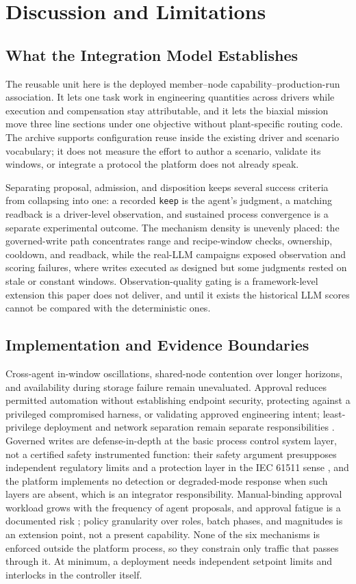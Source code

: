 \section{Discussion and Limitations}
\label{sec:limits}
\subsection{What the Integration Model Establishes}
The reusable unit here is the deployed member--node capability--production-run
association. It lets one task work in engineering quantities across drivers while
execution and compensation stay attributable, and it lets the biaxial mission move
three line sections under one objective without plant-specific routing code. The
archive supports configuration reuse inside the existing driver and scenario
vocabulary; it does not measure the effort to author a scenario, validate its
windows, or integrate a protocol the platform does not already speak.

Separating proposal, admission, and disposition keeps several success criteria from
collapsing into one: a recorded \texttt{keep} is the agent's judgment, a matching
readback is a driver-level observation, and sustained process convergence is a
separate experimental outcome. The mechanism density is unevenly placed: the
governed-write path concentrates range and recipe-window checks, ownership,
cooldown, and readback, while the real-LLM campaigns exposed observation and
scoring failures, where writes executed as designed but some judgments rested on
stale or constant windows. Observation-quality gating is a framework-level
extension this paper does not deliver, and until it exists the historical LLM
scores cannot be compared with the deterministic ones.

\subsection{Implementation and Evidence Boundaries}
Cross-agent in-window oscillations, shared-node
contention over longer horizons, and availability during storage failure remain
unevaluated. Approval reduces permitted automation without establishing endpoint security,
protecting against a privileged compromised harness, or validating approved
engineering intent; least-privilege deployment and network separation remain
separate responsibilities \cite{iec62443,nist80082}. Governed writes are
defense-in-depth at the basic process control system layer, not a certified safety
instrumented function: their safety argument presupposes independent regulatory
limits and a protection layer in the IEC 61511 sense \cite{iec61511}, and the
platform implements no detection or degraded-mode response when such layers are
absent, which is an integrator responsibility. Manual-binding approval workload
grows with the frequency of agent proposals, and approval fatigue is a documented
risk \cite{parasuraman2000model,bainbridge1983ironies}; policy granularity over
roles, batch phases, and magnitudes is an extension point, not a present
capability. None of the six mechanisms is enforced outside the platform process, so
they constrain only traffic that passes through it. At minimum, a deployment needs
independent setpoint limits and interlocks in the controller itself.

